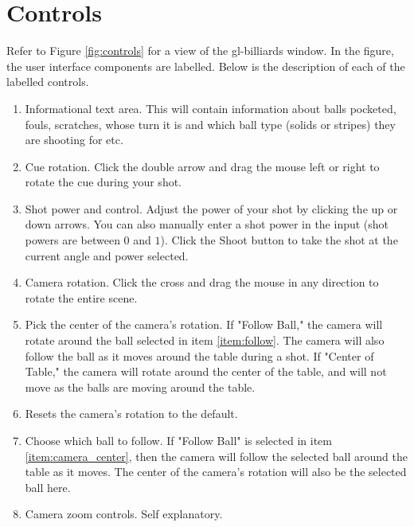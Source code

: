 
\section{Controls}
Refer to Figure \ref{fig:controls} for a view of the gl-billiards window. In the figure, the user interface components are labelled.
Below is the description of each of the labelled controls.

\begin{enumerate}
    \item Informational text area. This will contain information about balls pocketed, fouls, scratches, whose turn it is
    and which ball type (solids or stripes) they are shooting for etc.
    
    \item Cue rotation. Click the double arrow and drag  the mouse left or right to rotate the cue during your shot.

    \item Shot power and control. Adjust the power of your shot by clicking the up or down arrows. You can also manually enter
    a shot power in the input (shot powers are between $0$ and $1$). Click the Shoot button to take the shot at the current angle and power selected.
    
    \item Camera rotation. Click the cross and drag the mouse in any direction to rotate the entire scene.
    
    \item Pick the center of the camera's rotation. If "Follow Ball," the camera will rotate around the ball selected in item \ref{item:follow}.
    The camera will also follow the ball as it moves around the table during a shot. If "Center of Table," the camera will rotate around the center
    of the table, and will not move as the balls are moving around the table.   \label{item:camera_center}
    
    \item Resets the camera's rotation to the default.
    
    \item Choose which ball to follow. If "Follow Ball" is selected in item \ref{item:camera_center}, then the camera will follow the selected
    ball around the table as it moves. The center of the camera's rotation will also be the selected ball here. \label{item:follow}
    
    \item Camera zoom controls. Self explanatory.
    
\end{enumerate}

